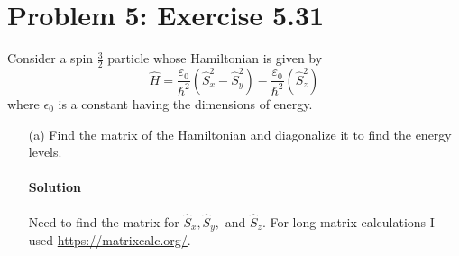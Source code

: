 \documentclass{article}
\begin{document}
	
\clearpage

	\section*{Problem 5: Exercise 5.31}
	
	Consider a spin $\frac{3}{2}$ particle whose Hamiltonian is given by
	\begin{equation} \label{eq:5}
		\hat{H} = \frac{\varepsilon_0}{\hbar^2} ( \hat{S}^2_x - \hat{S}^2_y ) - \frac{\varepsilon_0}{\hbar^2} ( \hat{S}^2_z ) 
	\end{equation}
	where $\epsilon_0$ is a constant having the dimensions of energy.
	\begin{enumerate}
		\item[(a)] Find the matrix of the Hamiltonian and diagonalize it to find the energy levels.
		\paragraph{Solution} Need to find the matrix for $\hat{S}_x, \hat{S}_y,$ and $\hat{S}_z$. For long matrix calculations I used \href{https://matrixcalc.org/}{https://matrixcalc.org/}.
		

\end{enumerate}
\end{document}
